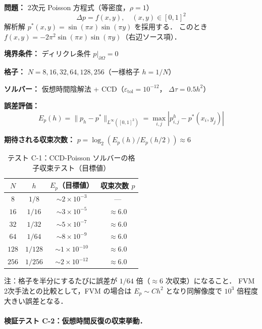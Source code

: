\begin{tcolorbox}[algbox, title={テスト C-1 の設定}]
\textbf{問題：} 2次元 Poisson 方程式（等密度，$\rho = 1$）
\[
  \Delta p = f(x,y), \quad (x,y) \in [0,1]^2
\]
解析解 $p^*(x,y) = \sin(\pi x)\sin(\pi y)$ を採用する．
このとき $f(x,y) = -2\pi^2\sin(\pi x)\sin(\pi y)$（右辺ソース項）．

\textbf{境界条件：} ディリクレ条件 $p|_{\partial\Omega} = 0$

\textbf{格子：} $N = 8, 16, 32, 64, 128, 256$（一様格子 $h = 1/N$）

\textbf{ソルバー：} 仮想時間陰解法 + CCD（$\varepsilon_{\mathrm{tol}} = 10^{-12}$，
$\Delta\tau = 0.5h^2$）

\textbf{誤差評価：}
\[
  E_p(h) = \|p_h - p^*\|_{L^\infty([0,1]^2)}
  = \max_{i,j}|p_{i,j}^h - p^*(x_i, y_j)|
\]

\textbf{期待される収束次数：} $p = \log_2(E_p(h)/E_p(h/2)) \approx 6$
\end{tcolorbox}

\begin{table}[htbp]
\centering
\caption{テスト C-1：CCD-Poisson ソルバーの格子収束テスト（目標値）}
\label{tab:ccd_poisson_conv}
\begin{tabular}{cccc}
\toprule
$N$ & $h$ & $E_p$（目標値） & 収束次数 $p$ \\
\midrule
$8$   & $1/8$   & $\sim 2 \times 10^{-3}$ & --- \\
$16$  & $1/16$  & $\sim 3 \times 10^{-5}$ & $\approx 6.0$ \\
$32$  & $1/32$  & $\sim 5 \times 10^{-7}$ & $\approx 6.0$ \\
$64$  & $1/64$  & $\sim 8 \times 10^{-9}$ & $\approx 6.0$ \\
$128$ & $1/128$ & $\sim 1 \times 10^{-10}$ & $\approx 6.0$ \\
$256$ & $1/256$ & $\sim 2 \times 10^{-12}$ & $\approx 6.0$ \\
\bottomrule
\end{tabular}

\medskip
注：格子を半分にするたびに誤差が $1/64$ 倍（$\approx 6$ 次収束）になること．
FVM 2次手法との比較として，FVM の場合は $E_p \sim C h^2$ となり同解像度で $10^3$ 倍程度大きい誤差となる．
\end{table}

\paragraph{検証テスト C-2：仮想時間反復の収束挙動．}
\label{sec:ccd_test_c2}


